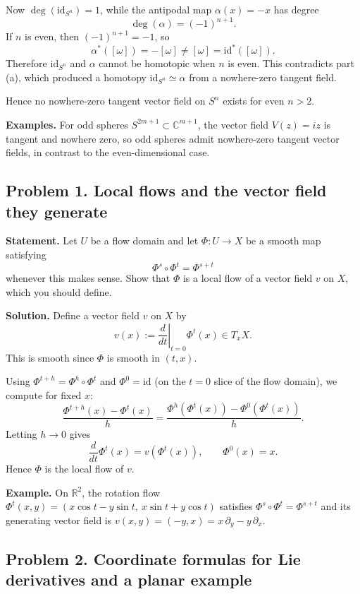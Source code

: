 \documentclass[12pt,a4paper]{article}
\theoremstyle{plain}
\theoremstyle{definition}      %
\begin{document}
Now $\deg(\mathrm{id}_{S^n})=1$, while the antipodal map $\alpha(x)=-x$ has degree
\[
\deg(\alpha)=(-1)^{n+1}.
\]
If $n$ is even, then $(-1)^{n+1}=-1$, so
\[
\alpha^*([\omega])=-[\omega]\neq [\omega]=\mathrm{id}^*([\omega]).
\]
Therefore $\mathrm{id}_{S^n}$ and $\alpha$ cannot be homotopic when $n$ is even.
This contradicts part (a), which produced a homotopy $\mathrm{id}_{S^n}\simeq \alpha$ from a nowhere-zero tangent field.

Hence no nowhere-zero tangent vector field on $S^n$ exists for even $n>2$.

\medskip
\textbf{Examples.}
For odd spheres $S^{2m+1}\subset \mathbb{C}^{m+1}$, the vector field $V(z)=iz$ is tangent and nowhere zero, so odd spheres admit
nowhere-zero tangent vector fields, in contrast to the even-dimensional case.

	
\subsection*{Problem 1. Local flows and the vector field they generate}

\textbf{Statement.}
Let $U$ be a flow domain and let $\Phi:U\to X$ be a smooth map satisfying
\[
\Phi^{s}\circ \Phi^{t}=\Phi^{s+t}
\]
whenever this makes sense. Show that $\Phi$ is a local flow of a vector field $v$ on $X$, which you should define.

\textbf{Solution.}
Define a vector field $v$ on $X$ by
\[
v(x):=\left.\frac{d}{dt}\right|_{t=0}\Phi^t(x)\in T_xX.
\]
This is smooth since $\Phi$ is smooth in $(t,x)$.

Using $\Phi^{t+h}=\Phi^h\circ\Phi^t$ and $\Phi^0=\mathrm{id}$ (on the $t=0$ slice of the flow domain), we compute for fixed $x$:
\[
\frac{\Phi^{t+h}(x)-\Phi^{t}(x)}{h}
=
\frac{\Phi^{h}(\Phi^t(x))-\Phi^{0}(\Phi^t(x))}{h}.
\]
Letting $h\to 0$ gives
\[
\frac{d}{dt}\Phi^t(x)=v(\Phi^t(x)),
\qquad
\Phi^0(x)=x.
\]
Hence $\Phi$ is the local flow of $v$.

\medskip
\textbf{Example.}
On $\mathbb R^2$, the rotation flow $\Phi^t(x,y)=(x\cos t-y\sin t,\ x\sin t+y\cos t)$ satisfies
$\Phi^{s}\circ\Phi^{t}=\Phi^{s+t}$ and its generating vector field is
$v(x,y)=(-y,x)=x\,\partial_y-y\,\partial_x$.


\bigskip
\subsection*{Problem 2. Coordinate formulas for Lie derivatives and a planar example}
\end{document}
